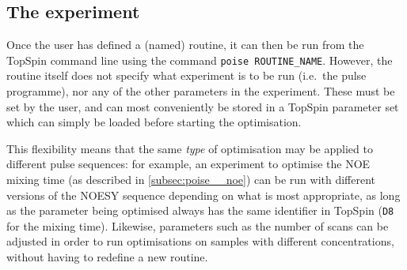 \subsection{The experiment}
\label{subsec:poise__experiment}

Once the user has defined a (named) routine, it can then be run from the TopSpin command line using the command \texttt{poise ROUTINE\_NAME}.
However, the routine itself does not specify what experiment is to be run (i.e.\ the pulse programme), nor any of the other parameters in the experiment.
These must be set by the user, and can most conveniently be stored in a TopSpin parameter set which can simply be loaded before starting the optimisation.

This flexibility means that the same \textit{type} of optimisation may be applied to different pulse sequences: for example, an experiment to optimise the NOE mixing time (as described in \cref{subsec:poise__noe}) can be run with different versions of the NOESY sequence depending on what is most appropriate, as long as the parameter being optimised always has the same identifier in TopSpin (\texttt{D8} for the mixing time).
Likewise, parameters such as the number of scans can be adjusted in order to run optimisations on samples with different concentrations, without having to redefine a new routine.
